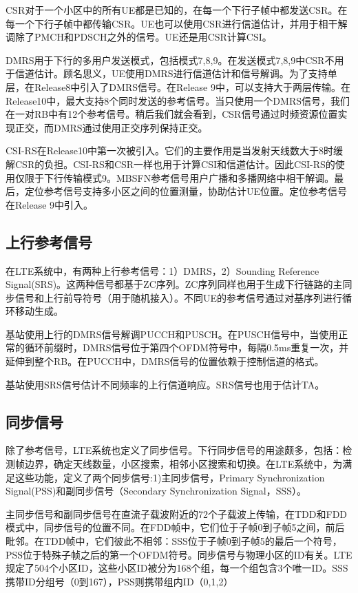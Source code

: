 \documentclass[10pt,a4paper,UTF8]{article}
\begin{document}
CSR对于一个小区中的所有UE都是已知的，在每一个下行子帧中都发送CSR。在每一个下行子帧中都传输CSR。UE也可以使用CSR进行信道估计，并用于相干解调除了PMCH和PDSCH之外的信号。UE还是用CSR计算CSI。

DMRS用于下行的多用户发送模式，包括模式7,8,9。在发送模式7,8,9中CSR不用于信道估计。顾名思义，UE使用DMRS进行信道估计和信号解调。为了支持单层，在Release8中引入了DMRS信号。在Release 9中，可以支持大于两层传输。在Release10中，最大支持8个同时发送的参考信号。当只使用一个DMRS信号，我们在一对RB中有12个参考信号。稍后我们就会看到，CSR信号通过时频资源位置实现正交，而DMRS通过使用正交序列保持正交。

CSI-RS在Release10中第一次被引入。它们的主要作用是当发射天线数大于8时缓解CSR的负担。CSI-RS和CSR一样也用于计算CSI和信道估计。因此CSI-RS的使用仅限于下行传输模式9。MBSFN参考信号用户广播和多播网络中相干解调。最后，定位参考信号支持多小区之间的位置测量，协助估计UE位置。定位参考信号在Release 9中引入。
\subsection{上行参考信号}
\label{sec:orgheadline22}


在LTE系统中，有两种上行参考信号：1）DMRS，2）Sounding Reference Signal(SRS)。这两种信号都基于ZC序列。ZC序列同样也用于生成下行链路的主同步信号和上行前导符号（用于随机接入）。不同UE的参考信号通过对基序列进行循环移动生成。

基站使用上行的DMRS信号解调PUCCH和PUSCH。在PUSCH信号中，当使用正常的循环前缀时，DMRS信号位于第四个OFDM符号中，每隔0.5ms重复一次，并延伸到整个RB。在PUCCH中，DMRS信号的位置依赖于控制信道的格式。

基站使用SRS信号估计不同频率的上行信道响应。SRS信号也用于估计TA。
\subsection{同步信号}
\label{sec:orgheadline23}


除了参考信号，LTE系统也定义了同步信号。下行同步信号的用途颇多，包括：检测帧边界，确定天线数量，小区搜索，相邻小区搜索和切换。在LTE系统中，为满足这些功能，定义了两个同步信号:1)主同步信号，Primary Synchronization Signal(PSS)和副同步信号（Secondary Synchronization Signal，SSS）。

主同步信号和副同步信号在直流子载波附近的72个子载波上传输，在TDD和FDD模式中，同步信号的位置不同。在FDD帧中，它们位于子帧0到子帧5之间，前后毗邻。在TDD帧中，它们彼此不相邻：SSS位于子帧0到子帧5的最后一个符号，PSS位于特殊子帧之后的第一个OFDM符号。同步信号与物理小区的ID有关。LTE规定了504个小区ID，这些小区ID被分为168个组，每一个组包含3个唯一ID。SSS携带ID分组号（0到167），PSS则携带组内ID（0,1,2）
\end{document}
